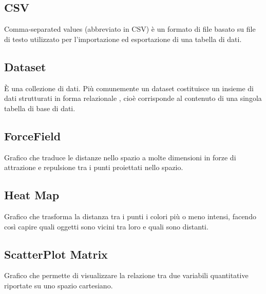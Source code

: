 \documentclass[../manuale_utente.tex]{subfiles}
\begin{document}
\subsection*{CSV}
{}
Comma-separated values (abbreviato in CSV) è un formato di file basato su file di testo utilizzato per l'importazione ed esportazione di una tabella di dati.

\subsection*{Dataset}
{}
È una collezione di dati. Più comunemente un dataset costituisce un insieme di dati strutturati in forma relazionale , cioè corrisponde al contenuto di una singola tabella di base di dati.

\subsection*{ForceField}
{}
Grafico che traduce le distanze nello spazio a molte dimensioni in forze di attrazione e repulsione tra i punti proiettati nello spazio.

\subsection*{Heat Map}
{}
Grafico che trasforma la distanza tra i punti i colori più o meno intensi, facendo così capire quali oggetti sono vicini tra loro e quali sono distanti.

\subsection*{ScatterPlot Matrix}
{}
Grafico che permette di visualizzare la relazione tra due variabili quantitative riportate su uno spazio cartesiano.
\end{document}
